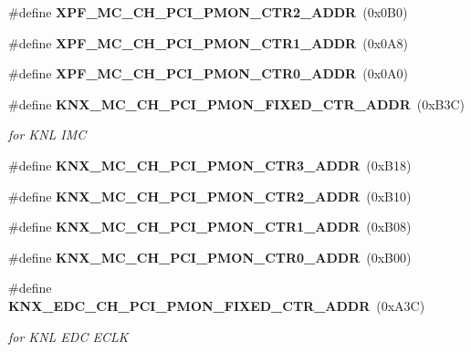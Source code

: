 \begin{DoxyCompactItemize}
\mbox{\label{types_8h_a64a491dfacbdc07772487ff99e272582}} 
\#define {\bfseries X\+P\+F\+\_\+\+M\+C\+\_\+\+C\+H\+\_\+\+P\+C\+I\+\_\+\+P\+M\+O\+N\+\_\+\+C\+T\+R2\+\_\+\+A\+D\+DR}~(0x0\+B0)
\item 
\mbox{\label{types_8h_a47ad956b9a84e085ca0cd2c7299fff02}} 
\#define {\bfseries X\+P\+F\+\_\+\+M\+C\+\_\+\+C\+H\+\_\+\+P\+C\+I\+\_\+\+P\+M\+O\+N\+\_\+\+C\+T\+R1\+\_\+\+A\+D\+DR}~(0x0\+A8)
\item 
\mbox{\label{types_8h_aa15e3e822a35761f6950ab4ff075c220}} 
\#define {\bfseries X\+P\+F\+\_\+\+M\+C\+\_\+\+C\+H\+\_\+\+P\+C\+I\+\_\+\+P\+M\+O\+N\+\_\+\+C\+T\+R0\+\_\+\+A\+D\+DR}~(0x0\+A0)
\item 
\mbox{\label{types_8h_a191cb6cbf95771e6bc2974526b3b7fb3}} 
\#define \textbf{ K\+N\+X\+\_\+\+M\+C\+\_\+\+C\+H\+\_\+\+P\+C\+I\+\_\+\+P\+M\+O\+N\+\_\+\+F\+I\+X\+E\+D\+\_\+\+C\+T\+R\+\_\+\+A\+D\+DR}~(0x\+B3\+C)
\begin{DoxyCompactList}\small\item\em for K\+NL I\+MC \end{DoxyCompactList}\item 
\mbox{\label{types_8h_a7fe7942388374ed8c555ee8d9defdce1}} 
\#define {\bfseries K\+N\+X\+\_\+\+M\+C\+\_\+\+C\+H\+\_\+\+P\+C\+I\+\_\+\+P\+M\+O\+N\+\_\+\+C\+T\+R3\+\_\+\+A\+D\+DR}~(0x\+B18)
\item 
\mbox{\label{types_8h_ab88aa1d85423e6cf0a9acb09dc1b43a8}} 
\#define {\bfseries K\+N\+X\+\_\+\+M\+C\+\_\+\+C\+H\+\_\+\+P\+C\+I\+\_\+\+P\+M\+O\+N\+\_\+\+C\+T\+R2\+\_\+\+A\+D\+DR}~(0x\+B10)
\item 
\mbox{\label{types_8h_a1eecfb40f66fe32107fcce34f880dfdd}} 
\#define {\bfseries K\+N\+X\+\_\+\+M\+C\+\_\+\+C\+H\+\_\+\+P\+C\+I\+\_\+\+P\+M\+O\+N\+\_\+\+C\+T\+R1\+\_\+\+A\+D\+DR}~(0x\+B08)
\item 
\mbox{\label{types_8h_ad2d16bd75e80f278c9b5fd4c1c05d88f}} 
\#define {\bfseries K\+N\+X\+\_\+\+M\+C\+\_\+\+C\+H\+\_\+\+P\+C\+I\+\_\+\+P\+M\+O\+N\+\_\+\+C\+T\+R0\+\_\+\+A\+D\+DR}~(0x\+B00)
\item 
\mbox{\label{types_8h_ac46e3092db596085637f63cd1f0cadde}} 
\#define \textbf{ K\+N\+X\+\_\+\+E\+D\+C\+\_\+\+C\+H\+\_\+\+P\+C\+I\+\_\+\+P\+M\+O\+N\+\_\+\+F\+I\+X\+E\+D\+\_\+\+C\+T\+R\+\_\+\+A\+D\+DR}~(0x\+A3\+C)
\begin{DoxyCompactList}\small\item\em for K\+NL E\+DC E\+C\+LK \end{DoxyCompactList}\item 
\mbox{\label{types_8h_a954a94cc2986ee7bb63cf3ff4cc29ca2}} 

\end{DoxyCompactItemize}
